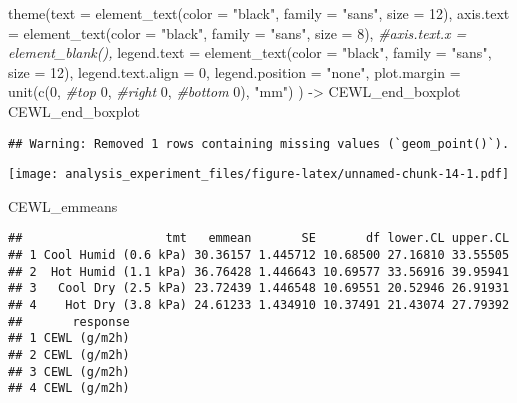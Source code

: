 \documentclass[
]{article}
\newenvironment{Shaded}{\begin{snugshade}}{\end{snugshade}}
\newcommand{\AttributeTok}[1]{\textcolor[rgb]{0.77,0.63,0.00}{#1}}
\newcommand{\CommentTok}[1]{\textcolor[rgb]{0.56,0.35,0.01}{\textit{#1}}}
\newcommand{\DecValTok}[1]{\textcolor[rgb]{0.00,0.00,0.81}{#1}}
\newcommand{\FunctionTok}[1]{\textcolor[rgb]{0.00,0.00,0.00}{#1}}
\newcommand{\NormalTok}[1]{#1}
\newcommand{\OtherTok}[1]{\textcolor[rgb]{0.56,0.35,0.01}{#1}}
\newcommand{\StringTok}[1]{\textcolor[rgb]{0.31,0.60,0.02}{#1}}
\begin{document}
\begin{Shaded}
\begin{Highlighting}[]
  \FunctionTok{theme}\NormalTok{(}\AttributeTok{text =} \FunctionTok{element\_text}\NormalTok{(}\AttributeTok{color =} \StringTok{"black"}\NormalTok{, }
                            \AttributeTok{family =} \StringTok{"sans"}\NormalTok{, }
                            \AttributeTok{size =} \DecValTok{12}\NormalTok{),}
        \AttributeTok{axis.text =} \FunctionTok{element\_text}\NormalTok{(}\AttributeTok{color =} \StringTok{"black"}\NormalTok{, }
                                 \AttributeTok{family =} \StringTok{"sans"}\NormalTok{, }
                                 \AttributeTok{size =} \DecValTok{8}\NormalTok{),}
        \CommentTok{\#axis.text.x = element\_blank(),}
        \AttributeTok{legend.text =} \FunctionTok{element\_text}\NormalTok{(}\AttributeTok{color =} \StringTok{"black"}\NormalTok{, }
                                 \AttributeTok{family =} \StringTok{"sans"}\NormalTok{, }
                                 \AttributeTok{size =} \DecValTok{12}\NormalTok{),}
        \AttributeTok{legend.text.align =} \DecValTok{0}\NormalTok{,}
        \AttributeTok{legend.position =} \StringTok{"none"}\NormalTok{,}
        \AttributeTok{plot.margin =} \FunctionTok{unit}\NormalTok{(}\FunctionTok{c}\NormalTok{(}\DecValTok{0}\NormalTok{, }\CommentTok{\#top}
                              \DecValTok{0}\NormalTok{, }\CommentTok{\#right}
                              \DecValTok{0}\NormalTok{, }\CommentTok{\#bottom}
                              \DecValTok{0}\NormalTok{), }\StringTok{"mm"}\NormalTok{)}
\NormalTok{        ) }\OtherTok{{-}\textgreater{}}\NormalTok{ CEWL\_end\_boxplot}
\NormalTok{CEWL\_end\_boxplot}
\end{Highlighting}
\end{Shaded}

\begin{verbatim}
## Warning: Removed 1 rows containing missing values (`geom_point()`).
\end{verbatim}

\texttt{[image: analysis\_experiment\_files/figure-latex/unnamed-chunk-14-1.pdf]}

\begin{Shaded}
\begin{Highlighting}[]
\NormalTok{CEWL\_emmeans}
\end{Highlighting}
\end{Shaded}

\begin{verbatim}
##                    tmt   emmean       SE       df lower.CL upper.CL
## 1 Cool Humid (0.6 kPa) 30.36157 1.445712 10.68500 27.16810 33.55505
## 2  Hot Humid (1.1 kPa) 36.76428 1.446643 10.69577 33.56916 39.95941
## 3   Cool Dry (2.5 kPa) 23.72439 1.446548 10.69551 20.52946 26.91931
## 4    Hot Dry (3.8 kPa) 24.61233 1.434910 10.37491 21.43074 27.79392
##       response
## 1 CEWL (g/m2h)
## 2 CEWL (g/m2h)
## 3 CEWL (g/m2h)
## 4 CEWL (g/m2h)
\end{verbatim}
\end{document}
